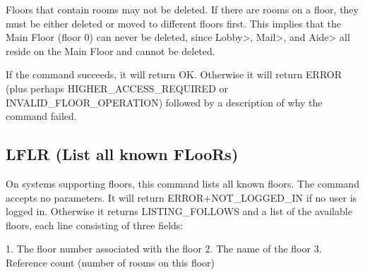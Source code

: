  Floors that contain rooms may not be deleted.  If there are rooms on a floor,
they must be either deleted or moved to different floors first.  This implies
that the Main Floor (floor 0) can never be deleted, since Lobby>, Mail>, and
Aide> all reside on the Main Floor and cannot be deleted.

 If the command succeeds, it will return OK.  Otherwise it will return
ERROR (plus perhaps HIGHER_ACCESS_REQUIRED or INVALID_FLOOR_OPERATION)
followed by a description of why the command failed.



\subsection{LFLR (List all known FLooRs)}

 On systems supporting floors, this command lists all known floors.  The
command accepts no parameters.  It will return ERROR+NOT_LOGGED_IN if no
user is logged in.  Otherwise it returns LISTING_FOLLOWS and a list of
the available floors, each line consisting of three fields:

 1. The floor number associated with the floor
 2. The name of the floor
 3. Reference count (number of rooms on this floor)



